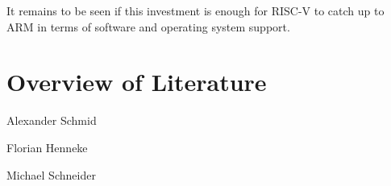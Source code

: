 \documentclass[conference]{IEEEtran}
\begin{document}
	It remains to be seen if this investment is enough for RISC-V to catch up to ARM in terms of software and operating system support.

\section{Overview of Literature}
Alexander Schmid \cite{Akram2017} \cite{Arm2020} \cite{Asanovic2014} \cite{HeuiLee2001} \cite{Patterson2019} \cite{Perotti2020} \cite{Shore2015} \cite{Waterman2016} \cite{Xu2003}

Florian Henneke \cite{Waterman2016} \cite{Ryzhyk2006} \cite{Asanovic2014} \cite{Furber2000} \cite{Microsoft2020} \cite{Greenwaves2020} \cite{Aws2020} \cite{Microsoft2020}

Michael Schneider \cite{Waterman2017} \cite{Arm2020} \cite{Ho} \cite{Imperas} \cite{International2020} \cite{Levy2005} \cite{Berkeley2019} \cite{Holdings2018} \cite{Limited2019} \cite{LauranneChoquin2020}



\end{document}
